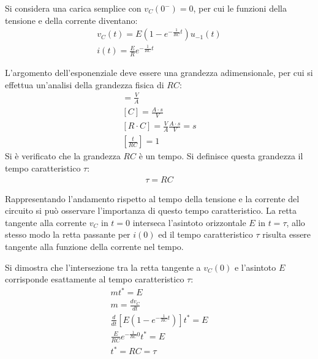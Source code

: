 \documentclass{article}
\numberwithin{equation}{subsection}
\begin{document}
Si considera una carica semplice con $v_C(0^-)=0$, per cui le funzioni della tensione e della corrente diventano:
\begin{gather*}
    v_C(t)=E\left(1-e^{-\frac{1}{RC}t}\right)u_{-1}(t)\\
    i(t)=\displaystyle\frac{E}{R}e^{-\frac{1}{RC}t}
\end{gather*}

L'argomento dell'esponenziale deve essere una grandezza adimensionale, per cui si effettua un'analisi della grandezza fisica di $RC$:
\begin{gather*}
    [R]=\displaystyle\frac{V}{A}\\
    [C]=\displaystyle\frac{A\cdot s}{V}\\
    [R\cdot C]=\displaystyle\frac{V}{A}\frac{A\cdot s}{V}=s\\
    \left[\displaystyle\frac{t}{RC}\right]=1  
\end{gather*}
Si è verificato che la grandezza $RC$ è un tempo. Si definisce questa grandezza il tempo caratteristico $\tau$:
\begin{gather*}
    \tau=RC
\end{gather*}

Rappresentando l'andamento rispetto al tempo della tensione e la corrente del circuito si può osservare l'importanza di questo tempo caratteristico. La retta tangente alla corrente 
$v_C$ in $t=0$ interseca l'asintoto orizzontale $E$ in $t=\tau$, allo stesso modo la retta passante per $i(0)$ ed il tempo caratteristico $\tau$ risulta essere tangente alla 
funzione della corrente nel tempo. 
\begin{center}
\end{center}
Si dimostra che l'intersezione tra la retta tangente a $v_C(0)$ e l'asintoto $E$ corrisponde esattamente al tempo caratteristico $\tau$:
\begin{gather*}
    mt^*=E\\
    m=\displaystyle\frac{dv_C}{dt}\\
    \displaystyle\frac{d}{dt}\left[E\left(1-e^{-\frac{1}{RC}t}\right)\right]t^*=E\\
    \displaystyle\frac{E}{RC}e^{-\frac{1}{RC}0}t^*=E\\
    t^*=RC=\tau
\end{gather*}
\end{document}
